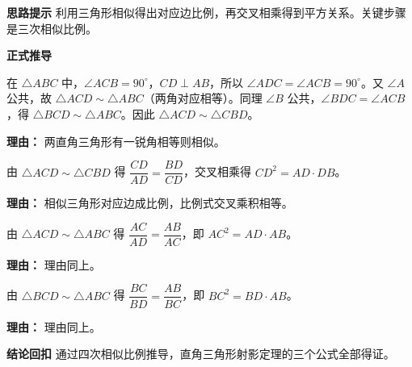 \begin{proofbox}
	\textbf{\textcolor{CProof}{思路提示}}
	利用三角形相似得出对应边比例，再交叉相乘得到平方关系。关键步骤是三次相似比例。

	\medskip
	\textbf{\textcolor{CProof}{正式推导}}
	\begin{description}[style=nextline, leftmargin=2.8em, labelsep=0.5em, itemsep=0.55em]
		\item[\textbf{步骤一（证三角形相似）：}]
			在 $\triangle ABC$ 中，$\angle ACB = 90^\circ$，$CD \perp AB$，所以 $\angle ADC = \angle ACB = 90^\circ$。又 $\angle A$ 公共，故 $\triangle ACD \sim \triangle ABC$（两角对应相等）。同理 $\angle B$ 公共，$\angle BDC = \angle ACB$，得 $\triangle BCD \sim \triangle ABC$。因此 $\triangle ACD \sim \triangle CBD$。
			\par\textbf{理由：} 两直角三角形有一锐角相等则相似。
		\item[\textbf{步骤二（推高平方）：}]
			由 $\triangle ACD \sim \triangle CBD$ 得 $\dfrac{CD}{AD} = \dfrac{BD}{CD}$，交叉相乘得 $CD^2 = AD \cdot DB$。
			\par\textbf{理由：} 相似三角形对应边成比例，比例式交叉乘积相等。
		\item[\textbf{步骤三（推直角边一）：}]
			由 $\triangle ACD \sim \triangle ABC$ 得 $\dfrac{AC}{AD} = \dfrac{AB}{AC}$，即 $AC^2 = AD \cdot AB$。
			\par\textbf{理由：} 理由同上。
		\item[\textbf{步骤四（推直角边二）：}]
			由 $\triangle BCD \sim \triangle ABC$ 得 $\dfrac{BC}{BD} = \dfrac{AB}{BC}$，即 $BC^2 = BD \cdot AB$。
			\par\textbf{理由：} 理由同上。
	\end{description}

	\medskip
	\textbf{\textcolor{CProof}{结论回扣}}
	通过四次相似比例推导，直角三角形射影定理的三个公式全部得证。
\end{proofbox}
